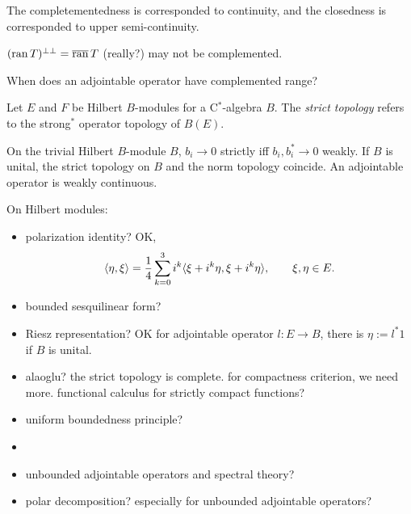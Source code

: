 \documentclass{../../large}
\begin{document}
The completementedness is corresponded to continuity, and the closedness is corresponded to upper semi-continuity.

$(\operatorname{ran} T)^{\perp\perp}=\overline{\operatorname{ran}}\,T$ (really?) may not be complemented.


When does an adjointable operator have complemented range?


\begin{prb}
\end{prb}

\begin{prb}
Let $E$ and $F$ be Hilbert $B$-modules for a C$^*$-algebra $B$.
The \emph{strict topology} refers to the strong$^*$ operator topology of $B(E)$.



On the trivial Hilbert $B$-module $B$, $b_i\to0$ strictly iff $b_i,b_i^*\to0$ weakly.
If $B$ is unital, the strict topology on $B$ and the norm topology coincide.
An adjointable operator is weakly continuous.





\end{prb}



On Hilbert modules:
\begin{itemize}
\item polarization identity? OK,
\[\langle\eta,\xi\rangle=\frac14\sum_{k=0}^3i^k\langle\xi+i^k\eta,\xi+i^k\eta\rangle,\qquad \xi,\eta\in E.\]
\item bounded sesquilinear form?
\item Riesz representation? OK for adjointable operator $l:E\to B$, there is $\eta:=l^*1$ if $B$ is unital.
\item alaoglu? the strict topology is complete. for compactness criterion, we need more. functional calculus for strictly compact functions?
\item uniform boundedness principle?
\item 
\item unbounded adjointable operators and spectral theory?
\item polar decomposition? especially for unbounded adjointable operators?
\end{itemize}
\end{document}
